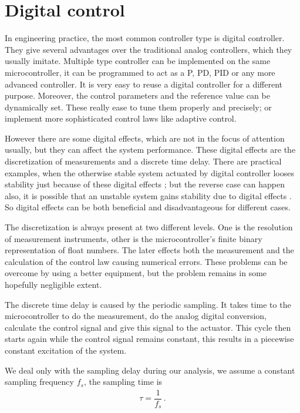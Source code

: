 \section{Digital control} \label{sec:digital_control}

In engineering practice, the most common controller type is digital controller. 
They give several advantages over the traditional analog controllers, which they usually imitate. 
Multiple type controller can be implemented on the same microcontroller, it can be programmed to act as a P, PD, PID or any more advanced controller. 
It is very easy to reuse a digital controller for a different purpose. Moreover, the control parameters and the reference value can be dynamically set. 
These really ease to tune them properly and precisely; or implement more sophisticated control laws like adaptive control.

However there are some digital effects, which are not in the focus of attention usually, but they can affect the system performance. 
These digital effects are the discretization of measurements and a discrete time delay.
There are practical examples, when the otherwise stable system actuated by digital controller looses stability just because of these digital effects \cite{stepan1989retarded,stepan2001vibrations}; but the reverse case can happen also, it is possible that an unstable system gains stability due to digital effects \cite{veraszto2017nonlinear}. 
So digital effects can be both beneficial and disadvantageous for different cases.

The discretization is always present at two different levels.
One is the resolution of measurement instruments, other is the microcontroller's finite binary representation of float numbers.
The later effects both the measurement and the calculation of the control law causing numerical errors.
These problems can be overcome by using a better equipment, but the problem remains in some hopefully negligible extent.

The discrete time delay is caused by the periodic sampling. 
It takes time to the microcontroller to do the measurement, do the analog digital conversion, calculate the control signal and give this signal to the actuator. This cycle then starts again while the control signal remains constant, this results in a piecewise constant excitation of the system.

We deal only with the sampling delay during our analysis, we assume a constant sampling frequency $f_s$, the  sampling time is 
\begin{align}
	\tau = \dfrac{1}{f_s}\,.
\end{align}

